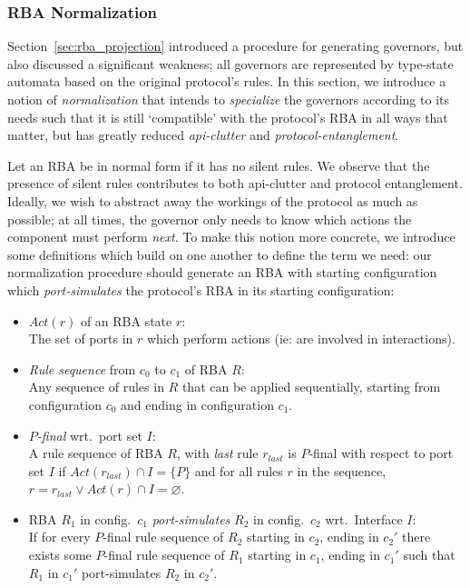 \subsubsection{RBA Normalization}
\label{sec:rba_normalization}
Section~\ref{sec:rba_projection} introduced a procedure for generating governors, but also discussed a significant weakness; all governors are represented by type-state automata based on the original protocol's rules. In this section, we introduce a notion of \textit{normalization} that intends to \textit{specialize} the governors according to its needs such that it is still `compatible' with the protocol's RBA in all ways that matter, but has greatly reduced \textit{api-clutter} and \textit{protocol-entanglement}. 

Let an RBA be in normal form if it has no silent rules. We observe that the presence of silent rules contributes to both api-clutter and protocol entanglement. Ideally, we wish to abstract away the workings of the protocol as much as possible; at all times, the governor only needs to know which actions the component must perform \textit{next}. To make this notion more concrete, we introduce some definitions which build on one another to define the term we need: our normalization procedure should generate an RBA with starting configuration which \textit{port-simulates} the protocol's RBA in its starting configuration:
\begin{itemize}
	\item $Act(r)$ of an RBA state $r$:\\
	The set of ports in $r$ which perform actions (ie: are involved in interactions).
	
	\item \textit{Rule sequence} from $c_0$ to $c_1$ of RBA $R$:\\
	Any sequence of rules in $R$ that can be applied sequentially, starting from configuration $c_0$ and ending in configuration $c_1$.
	
	\item \textit{$P$-final} wrt.\ port set $I$:\\
	A rule sequence of RBA $R$, with \textit{last} rule $r_{last}$ is $P$-final with respect to port set $I$ if $Act(r_{last})\cap{}I=\{P\}$ and for all rules $r$ in the sequence, $r=r_{last} \lor{} Act(r)\cap{}I=\varnothing$.	
	
	\item RBA $R_1$ in config.\ $c_1$ \textit{port-simulates} $R_2$ in config.\ $c_2$ wrt.\ Interface $I$:\\
	If for every $P$-final rule sequence of $R_2$ starting in $c_2$, ending in $c_2'$ there exists some $P$-final rule sequence of $R_1$ starting in $c_1$, ending in $c_1'$ such that $R_1$ in $c_1'$ port-simulates $R_2$ in $c_2'$.
\end{itemize}

